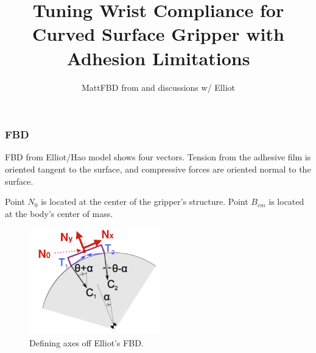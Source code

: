 \documentclass{beamer}
\begin{document}




\title{Tuning Wrist Compliance for Curved Surface Gripper with Adhesion Limitations}
\subtitle{}
\author{Matt\newline FBD from and discussions w/ Elliot}

\frame
{
\titlepage
 }

\frame
{
\frametitle{FBD}

FBD from Elliot/Hao model shows four vectors. Tension from the adhesive film is oriented tangent to the surface, and compressive forces are oriented normal to the surface. 

Point $N_{0}$ is located at the center of the gripper's structure. 
Point $B_{cm}$ is located at the body's center of mass. 

\begin{figure}[htb]
	\centering
	\includegraphics[width=2.25in]{images/gripperLabel.png}
	\caption{Defining axes off Elliot's FBD.}
	\label{fig:FBD}
\end{figure}
}
\end{document}
